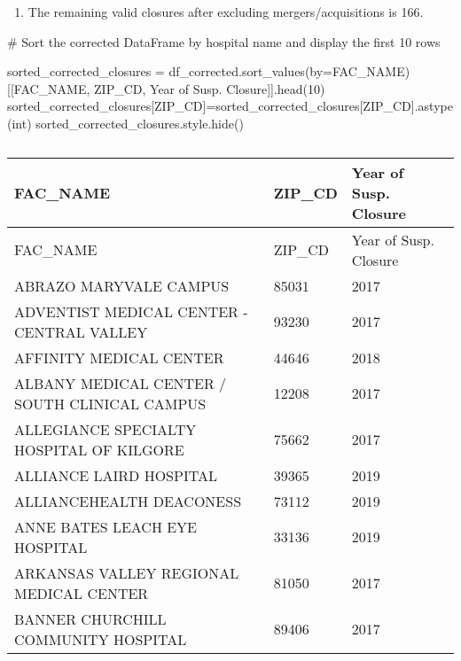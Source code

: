 \documentclass[
  letterpaper,
  DIV=11,
  numbers=noendperiod]{scrartcl}
\newenvironment{Shaded}{\begin{snugshade}}{\end{snugshade}}
\newcommand{\BuiltInTok}[1]{\textcolor[rgb]{0.00,0.23,0.31}{#1}}
\newcommand{\CommentTok}[1]{\textcolor[rgb]{0.37,0.37,0.37}{#1}}
\newcommand{\DecValTok}[1]{\textcolor[rgb]{0.68,0.00,0.00}{#1}}
\newcommand{\NormalTok}[1]{\textcolor[rgb]{0.00,0.23,0.31}{#1}}
\newcommand{\OperatorTok}[1]{\textcolor[rgb]{0.37,0.37,0.37}{#1}}
\newcommand{\StringTok}[1]{\textcolor[rgb]{0.13,0.47,0.30}{#1}}
\providecommand{\tightlist}{%
  \setlength{\itemsep}{0pt}\setlength{\parskip}{0pt}}\usepackage{longtable,booktabs,array}
\begin{document}
\begin{enumerate}
\def\labelenumi{\alph{enumi}.}
\setcounter{enumi}{2}
\tightlist
\item
  The remaining valid closures after excluding mergers/acquisitions is
  166.
\end{enumerate}

\begin{Shaded}
\begin{Highlighting}[]
\CommentTok{\# Sort the corrected DataFrame by hospital name and display the first 10 rows}

\NormalTok{sorted\_corrected\_closures }\OperatorTok{=}\NormalTok{ df\_corrected.sort\_values(by}\OperatorTok{=}\StringTok{\textquotesingle{}FAC\_NAME\textquotesingle{}}\NormalTok{)[[}\StringTok{\textquotesingle{}FAC\_NAME\textquotesingle{}}\NormalTok{, }\StringTok{\textquotesingle{}ZIP\_CD\textquotesingle{}}\NormalTok{, }\StringTok{\textquotesingle{}Year of Susp. Closure\textquotesingle{}}\NormalTok{]].head(}\DecValTok{10}\NormalTok{)}
\NormalTok{sorted\_corrected\_closures[}\StringTok{\textquotesingle{}ZIP\_CD\textquotesingle{}}\NormalTok{]}\OperatorTok{=}\NormalTok{sorted\_corrected\_closures[}\StringTok{\textquotesingle{}ZIP\_CD\textquotesingle{}}\NormalTok{].astype(}\BuiltInTok{int}\NormalTok{)}
\NormalTok{sorted\_corrected\_closures.style.hide()}
\end{Highlighting}
\end{Shaded}

\begin{longtable}[]{@{}lll@{}}
\caption{}\label{T_3df21}\tabularnewline
\toprule\noalign{}
FAC\_NAME & ZIP\_CD & Year of Susp. Closure \\
\midrule\noalign{}
\endfirsthead
\toprule\noalign{}
FAC\_NAME & ZIP\_CD & Year of Susp. Closure \\
\midrule\noalign{}
\endhead
\bottomrule\noalign{}
\endlastfoot
ABRAZO MARYVALE CAMPUS & 85031 & 2017 \\
ADVENTIST MEDICAL CENTER - CENTRAL VALLEY & 93230 & 2017 \\
AFFINITY MEDICAL CENTER & 44646 & 2018 \\
ALBANY MEDICAL CENTER / SOUTH CLINICAL CAMPUS & 12208 & 2017 \\
ALLEGIANCE SPECIALTY HOSPITAL OF KILGORE & 75662 & 2017 \\
ALLIANCE LAIRD HOSPITAL & 39365 & 2019 \\
ALLIANCEHEALTH DEACONESS & 73112 & 2019 \\
ANNE BATES LEACH EYE HOSPITAL & 33136 & 2019 \\
ARKANSAS VALLEY REGIONAL MEDICAL CENTER & 81050 & 2017 \\
BANNER CHURCHILL COMMUNITY HOSPITAL & 89406 & 2017 \\
\end{longtable}
\end{document}

